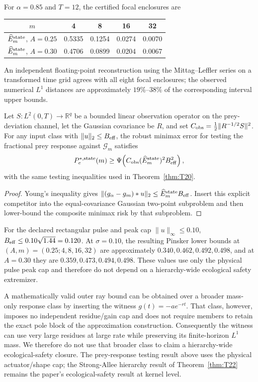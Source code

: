 For $\alpha=0.85$ and $T=12$, the certified focal enclosures are
\begin{center}\small
\begin{tabular}{c|cccc}
$m$ & 4 & 8 & 16 & 32\\\hline
$\widehat E_m^{\rm state}$, $A=0.25$ & 0.5335 & 0.1254 & 0.0274 & 0.0070\\
$\widehat E_m^{\rm state}$, $A=0.30$ & 0.4706 & 0.0899 & 0.0204 & 0.0067
\end{tabular}
\end{center}
An independent floating-point reconstruction using the Mittag--Leffler series on a transformed time grid agrees with all eight focal enclosures; the observed numerical $L^1$ distances are approximately $19\%$--$38\%$ of the corresponding interval upper bounds.

\begin{corollary}
\label{cor:state_testing}
Let $S:L^2(0,T)\to\mathbb R^q$ be a bounded linear observation operator on the prey-deviation channel, let the Gaussian covariance be $R$, and set $C_{\rm obs}=\tfrac12\|R^{-1/2}S\|^2$. For any input class with $\|u\|_2\le B_{\rm eff}$, the robust minimax error for testing the fractional prey response against $\mathcal G_m$ satisfies
\[
P_e^{*,\rm state}(m)\ge\Psi\!\left(C_{\rm obs}(\widehat E_m^{\rm state})^2B_{\rm eff}^2\right),
\]
with the same testing inequalities used in Theorem~\ref{thm:T20}.
\end{corollary}
\begin{proof}
Young's inequality gives $\|(g_\alpha-g_m)*u\|_2\le\widehat E_m^{\rm state}B_{\rm eff}$. Insert this explicit competitor into the equal-covariance Gaussian two-point subproblem and then lower-bound the composite minimax risk by that subproblem.
\end{proof}

For the declared rectangular pulse and peak cap $\|u\|_\infty\le0.10$, $B_{\rm eff}\le0.10\sqrt{1.44}=0.120$. At $\sigma=0.10$, the resulting Pinsker lower bounds at $(A,m)=(0.25;4,8,16,32)$ are approximately $0.340,0.462,0.492,0.498$, and at $A=0.30$ they are $0.359,0.473,0.494,0.498$. These values use only the physical pulse peak cap and therefore do not depend on a hierarchy-wide ecological safety extremizer.

\begin{remark}
\label{rem:r6-safety-scope}
A mathematically valid outer ray bound can be obtained over a broader mass-only response class by inserting the witness $g(t)=-a e^{-rt}$. That class, however, imposes no independent residue/gain cap and does not require members to retain the exact pole block of the approximation construction. Consequently the witness can use very large residues at large rate while preserving its finite-horizon $L^1$ mass. We therefore do not use that broader class to claim a hierarchy-wide ecological-safety closure. The prey-response testing result above uses the physical actuator/shape cap; the Strong-Allee hierarchy result of Theorem~\ref{thm:T22} remains the paper's ecological-safety result at kernel level.
\end{remark}

